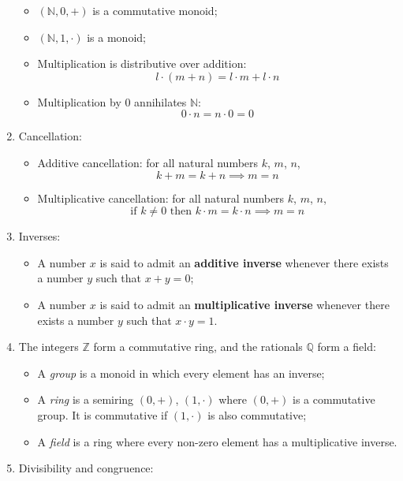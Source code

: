 \documentclass{article}
\begin{document}
\begin{enumerate}
\begin{itemize}[label={-},topsep=0pt]
            \item $(\mathbb{N},0,+)$ is a commutative monoid;
            \item $(\mathbb{N},1,\cdot)$ is a monoid;
            \item Multiplication is distributive over addition:
                $$l\cdot(m+n)=l\cdot m+l\cdot n$$
            \item Multiplication by 0 annihilates $\mathbb{N}$:
                $$0\cdot n=n\cdot 0=0$$
        \end{itemize}
    \item Cancellation:
        \begin{itemize}[label={-},topsep=0pt]
            \item Additive cancellation: for all natural numbers $k$, $m$, $n$,
                $$k+m=k+n\implies m=n$$
            \item Multiplicative cancellation: for all natural numbers $k$, $m$, $n$,
                $$\text{if }k\neq0\text{ then }k\cdot m=k\cdot n\implies m=n$$
        \end{itemize}
    \item Inverses:
        \begin{itemize}[label={-},topsep=0pt]
            \item A number $x$ is said to admit an \textbf{additive inverse} whenever there exists a number $y$ such that $x+y=0$;
            \item A number $x$ is said to admit an \textbf{multiplicative inverse} whenever there exists a number $y$ such that $x\cdot y=1$. 
        \end{itemize}
    \item The integers $\mathbb{Z}$ form a commutative ring, and the rationals $\mathbb{Q}$ form a field:
        \begin{itemize}[label={-},topsep=0pt]
            \item A \textit{group} is a monoid in which every element has an inverse;
            \item A \textit{ring} is a semiring $(0,+)$, $(1,\cdot)$ where $(0,+)$ is a commutative group. It is commutative if $(1,\cdot)$ is also commutative;
            \item A \textit{field} is a ring where every non-zero element has a multiplicative inverse.
        \end{itemize}
    \item Divisibility and congruence:
        \begin{itemize}[label={-},topsep=0pt]

\end{itemize}
\end{enumerate}
\end{document}
